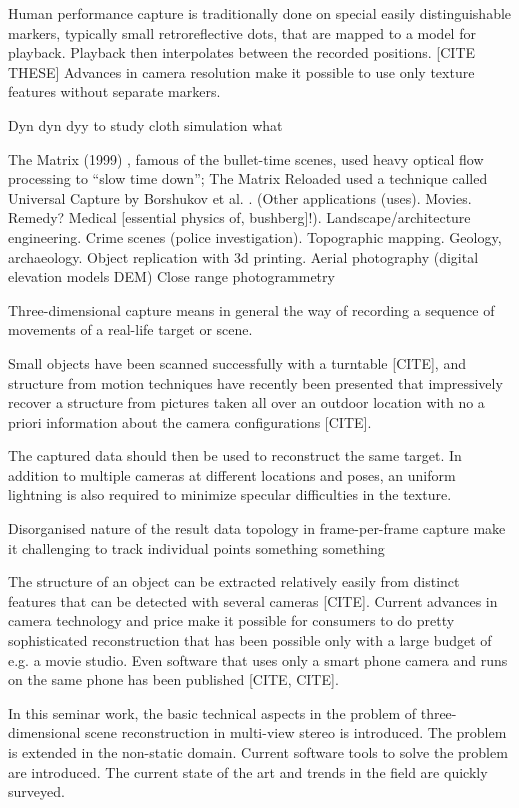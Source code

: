 Human performance capture is traditionally done on special easily distinguishable markers, typically small retroreflective dots, that are mapped to a model for playback. Playback then interpolates between the recorded positions. [CITE THESE] Advances in camera resolution make it possible to use only texture features without separate markers.

Dyn dyn dyy to study cloth simulation what

The Matrix (1999) \cite{wachowski99matrix}, famous of the bullet-time scenes, used heavy optical flow processing to ``slow time down''; The Matrix Reloaded \cite{wachowski03reloaded} used a technique called Universal Capture by Borshukov et al. \cite{borshukov05universal}.
(Other applications (uses). Movies. Remedy? Medical [essential physics of, bushberg]!). Landscape/architecture engineering. Crime scenes (police investigation). Topographic mapping. Geology, archaeology. Object replication with 3d printing. Aerial photography (digital elevation models DEM)
Close range photogrammetry

Three-dimensional capture means in general the way of recording a sequence of movements of a real-life target or scene.

Small objects have been scanned successfully with a turntable [CITE], and structure from motion techniques have recently been presented that impressively recover a structure from pictures taken all over an outdoor location with no a priori information about the camera configurations [CITE].

The captured data should then be used to reconstruct the same target.
In addition to multiple cameras at different locations and poses, an uniform lightning is also required to minimize specular difficulties in the texture.

Disorganised nature of the result data topology in frame-per-frame capture make it challenging to track individual points something something

The structure of an object can be extracted relatively easily from distinct features that can be detected with several cameras [CITE].
Current advances in camera technology and price make it possible for consumers to do pretty sophisticated reconstruction that has been possible only with a large budget of e.g. a movie studio.
Even software that uses only a smart phone camera and runs on the same phone has been published [CITE, CITE].

In this seminar work, the basic technical aspects in the problem of three-dimensional scene reconstruction in multi-view stereo is introduced. The problem is extended in the non-static domain. Current software tools to solve the problem are introduced. The current state of the art and trends in the field are quickly surveyed.
